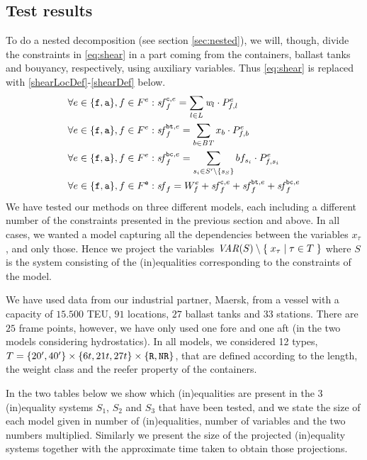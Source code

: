 \subsection{Test results}\label{sec:testResults}
To do a nested decomposition (see section \ref{sec:nested}), we will, though, divide the constraints in \eqref{eq:shear} in a part coming from the containers, ballast tanks and bouyancy, respectively, using auxiliary variables. Thus \eqref{eq:shear} is replaced with \eqref{shearLocDef}-\eqref{shearDef} below.
\begin{align}
\label{shearLocDef} 
\forall {e}\in\{\trt{f},\trt{a}\}, f \in \Sec^{e}:&\;
	\shear^{\trt{c},e}_f = \sum_{l \in L} \weight_l\cdot \Prop^{e}_{f,l}\\
%
\forall {e}\in\{\trt{f},\trt{a}\}, f \in \Sec^{e}:&\;
	\label{shearTanksDef}
	\shear^{\trt{bt},e}_f = \sum_{b \in \mi{BT}} x_b\cdot \Prop^{e}_{f,b} \\		
%
\forall {e}\in\{\trt{f},\trt{a}\}, f \in \Sec^{e}:&\;
	\label{shearBonjDef}
	\shear^{\trt{bc},e}_f = \sum_{s_i \in S'\setminus\{s_S\}} \bonjean_{s_i}\cdot \Prop^{e}_{f,s_i} \\
%
\forall {e}\in\{\trt{f},\trt{a}\}, f \in \Sec^\trt{e}:&\;
	\label{shearDef}
 	\shear_f = W^{e}_f +	\shear^{\trt{c},e}_f+ \shear^{\trt{bt},e}_f + \shear^{\trt{bc},e}_f
\end{align}
%
%
We have tested our methods on three different models, each including a different number of the constraints presented in the previous section and above. In all cases, we wanted a model capturing all the dependencies between the  variables $x_\tau$, and only those. Hence we project the variables $\mathit{VAR}(S)\setminus \{\;{x_\tau}\;|\;{\tau\in T}\;\}$ where $S$ is the system consisting of the (in)equalities corresponding to the constraints of the model.

We have used data from our industrial partner, Maersk, from a vessel with a capacity of $15.500$ TEU, $91$ locations, $27$ ballast tanks and $33$ stations. There are $25$ frame points, however, we have only used one fore and one aft (in the two models considering hydrostatics). In all models, we considered 12 types, $T = \{20', 40'\}\times \{6t, 21t, 27t\}\times\{\texttt{R}, \texttt{NR}\}$, that are defined according to the length, the weight class and the reefer property of the containers.

In the two tables below we show which (in)equalities are present in the 3 (in)equality systems $S_1$, $S_2$ and $S_3$ that have been tested, and we state the size of each model given in number of (in)equalities, number of variables and the two numbers multiplied. Similarly we present the size of the projected (in)equality systems together with the approximate time taken to obtain those projections. 

